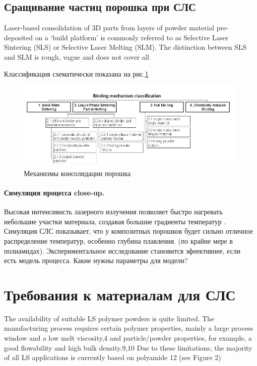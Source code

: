 \subsection{Сращивание частиц порошка при СЛС}
Laser-based consolidation of 3D parts from layers of
powder material pre-deposited on a ‘build platform’ is
commonly referred to as Selective Laser Sintering (SLS)
or Selective Laser Melting (SLM). The distinction between
SLS and SLM is rough, vague and does not cover all

Классификация схематически показана на рис.\ref{fig:binding}

\begin{figure}[h]
    \centering
    \includegraphics[width = \linewidth]{fig/binding.PNG}
    \caption{Механизмы консолидации порошка}
    \label{fig:binding}
\end{figure}

\paragraph{Симуляция процесса close-up.}


Высокая интенсивнсть лазерного излучения позволяет быстро нагревать небольшие участки материала, создавая большие градиенты температур \cite{sls-sim2016}.
\\
Симуляция СЛС показывает, что у композитных порошков будет сильно отличное распределение температур, особенно глубина плавления. (по крайне мере в полиамидах)\cite{sls-sim2016}. Экспериментальное исследование становится эфеективнее, если есть модель процесса.
Какие нужны параметры для модели?

\section{Требования к материалам для СЛС}




The availability of suitable LS polymer powders is quite limited.
The manufacturing process requires certain polymer properties,
mainly a large process window and a low melt viscosity,4 and
particle/powder properties, for example, a good flowability and
high bulk density.9,10 Due to these limitations, the majority of
all LS applications is currently based on polyamide 12 (see Figure
2)


